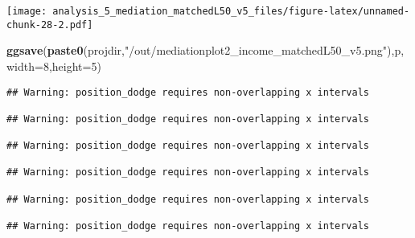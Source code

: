 \documentclass[
]{article}
\newenvironment{Shaded}{\begin{snugshade}}{\end{snugshade}}
\newcommand{\DataTypeTok}[1]{\textcolor[rgb]{0.13,0.29,0.53}{#1}}
\newcommand{\DecValTok}[1]{\textcolor[rgb]{0.00,0.00,0.81}{#1}}
\newcommand{\KeywordTok}[1]{\textcolor[rgb]{0.13,0.29,0.53}{\textbf{#1}}}
\newcommand{\NormalTok}[1]{#1}
\newcommand{\StringTok}[1]{\textcolor[rgb]{0.31,0.60,0.02}{#1}}
\begin{document}
\texttt{[image: analysis\_5\_mediation\_matchedL50\_v5\_files/figure-latex/unnamed-chunk-28-2.pdf]}

\begin{Shaded}
\begin{Highlighting}[]
\KeywordTok{ggsave}\NormalTok{(}\KeywordTok{paste0}\NormalTok{(projdir,}\StringTok{"/out/mediationplot2_income_matchedL50_v5.png"}\NormalTok{),p,}\DataTypeTok{width=}\DecValTok{8}\NormalTok{,}\DataTypeTok{height=}\DecValTok{5}\NormalTok{)}
\end{Highlighting}
\end{Shaded}

\begin{verbatim}
## Warning: position_dodge requires non-overlapping x intervals

## Warning: position_dodge requires non-overlapping x intervals

## Warning: position_dodge requires non-overlapping x intervals

## Warning: position_dodge requires non-overlapping x intervals

## Warning: position_dodge requires non-overlapping x intervals

## Warning: position_dodge requires non-overlapping x intervals
\end{verbatim}
\end{document}
